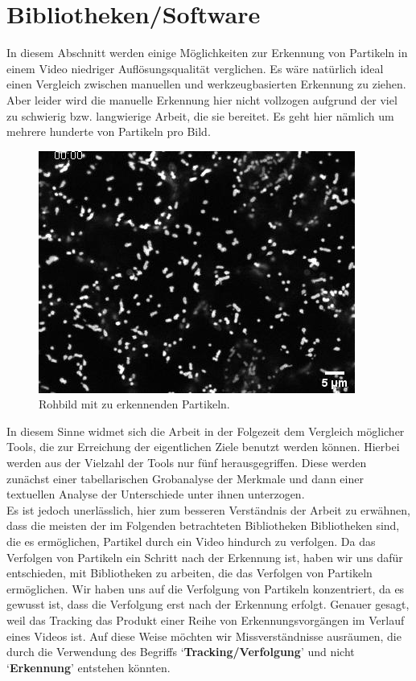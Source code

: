 \chapter{Bibliotheken/Software \label{kap1}}

In diesem  Abschnitt werden einige Möglichkeiten zur Erkennung von Partikeln in einem Video niedriger Auflösungsqualität verglichen. Es wäre natürlich ideal einen Vergleich zwischen manuellen und werkzeugbasierten Erkennung zu ziehen. Aber leider wird die manuelle Erkennung hier nicht vollzogen aufgrund der viel zu schwierig bzw. langwierige Arbeit, die sie bereitet. Es geht hier nämlich um mehrere hunderte von Partikeln pro Bild.\\
 
\begin{figure}[H]
    \centering
    \includegraphics[scale=0.9]{Grafiken/trackpyBilder/video-frame00001.png}
    \caption{Rohbild mit zu erkennenden Partikeln.}
    \label{fig:kap1_rohbild}
\end{figure}

In diesem Sinne widmet sich die Arbeit in der Folgezeit dem Vergleich möglicher Tools, die zur Erreichung der eigentlichen Ziele benutzt werden können. Hierbei werden aus der Vielzahl der Tools nur fünf herausgegriffen. Diese werden zunächst einer tabellarischen Grobanalyse der Merkmale und dann einer textuellen Analyse der Unterschiede unter ihnen unterzogen.\\

Es ist jedoch unerlässlich, hier zum besseren Verständnis der Arbeit zu erwähnen, dass die meisten der im Folgenden betrachteten Bibliotheken Bibliotheken sind, die es ermöglichen, Partikel durch ein Video hindurch zu verfolgen. Da das Verfolgen von Partikeln ein Schritt nach der Erkennung ist, haben wir uns dafür entschieden, mit Bibliotheken zu arbeiten, die das Verfolgen von Partikeln ermöglichen. Wir haben uns auf die Verfolgung von Partikeln konzentriert, da es gewusst ist, dass die Verfolgung erst nach der Erkennung erfolgt. Genauer gesagt, weil das Tracking das Produkt einer Reihe von Erkennungsvorgängen im Verlauf eines Videos ist.
Auf diese Weise möchten wir Missverständnisse ausräumen, die durch die Verwendung des Begriffs `\textbf{Tracking/Verfolgung}' und nicht `\textbf{Erkennung}' entstehen könnten.  

